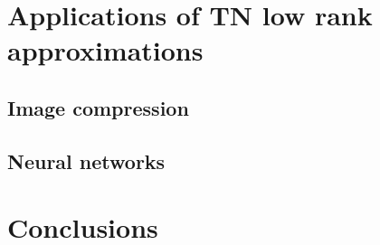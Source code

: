 \documentclass[11pt,a4paper,openright,oneside]{book}
\numberwithin{equation}{section}
\newcommand{\refeq}[1]{\cref{#1}}
\DeclareMathOperator{\TNS}{TNS}
\begin{document}
{\begin{defintion}

\chapter{Applications of TN low rank approximations}

\section{Image compression}

\section{Neural networks}



\chapter{Conclusions}


\end{defintion}}
\end{document}
